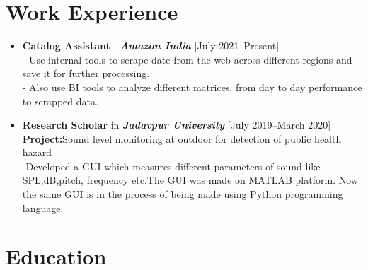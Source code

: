 \documentclass[11pt,a4paper]{moderncv}
\begin{document}

\section{Work Experience}

\begin{itemize}
	
	\item \textbf{Catalog Assistant} - \textit{\textbf{Amazon India}} \hfill [July 2021--Present]\\
	- Use internal tools to scrape date from the web across different regions and save it for further processing.\\
	- Also use BI tools to analyze different matrices, from day to day performance to scrapped data.\\
		
	
	\item \textbf{Research Scholar} in \textit{\textbf{Jadavpur University}} \hfill [July 2019--March 2020]\\
	\textbf{Project:}Sound level monitoring at
	outdoor for detection of public health hazard\\
	-Developed a GUI which measures different parameters of sound like
	SPL,dB,pitch, frequency etc.The GUI was made on MATLAB platform. Now the
	same GUI is in the process of being made using Python programming language.
	
	
\end{itemize}

\section{Education}
\end{document}
